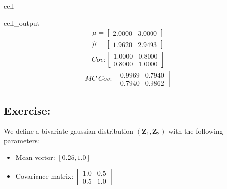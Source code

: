 \documentclass[letterpaper,10pt,english]{jupyterBook}
\begin{document}
\begin{sphinxuseclass}{cell}
\begin{sphinxVerbatimOutput}
\begin{sphinxuseclass}{cell_output}
\noindent{}
\begin{equation*}
\begin{split}\displaystyle \mu=\left[
\begin{array}{}
  2.0000 &  3.0000
\end{array}
\right]\end{split}
\end{equation*}\begin{equation*}
\begin{split}\displaystyle \hat{\mu}=\left[
\begin{array}{}
  1.9620 &  2.9493
\end{array}
\right]\end{split}
\end{equation*}\begin{equation*}
\begin{split}\displaystyle Cov:\left[
\begin{array}{}
  1.0000 &  0.8000\\
  0.8000 &  1.0000
\end{array}
\right]\end{split}
\end{equation*}\begin{equation*}
\begin{split}\displaystyle MC\ Cov:\left[
\begin{array}{}
  0.9969 &  0.7940\\
  0.7940 &  0.9862
\end{array}
\right]\end{split}
\end{equation*}
\end{sphinxuseclass}\end{sphinxVerbatimOutput}

\end{sphinxuseclass}

\subsection{Exercise:}
\label{\detokenize{01:exercise}}
\sphinxAtStartPar
We define a bivariate gaussian distribution \((\mathbf Z_1, \mathbf Z_2)\) with the following parameters:
\begin{itemize}
\item {} 
\sphinxAtStartPar
Mean vector: \([0.25, 1.0]\)

\item {} 
\sphinxAtStartPar
Covariance matrix: \(\begin{bmatrix}1.0&0.5\\0.5&1.0\end{bmatrix}\)

\end{itemize}
\end{document}
